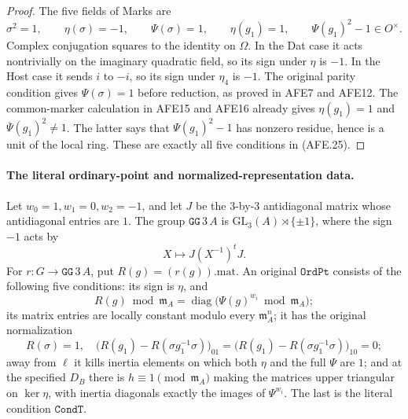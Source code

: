 \begin{proof}
The five fields of Marks are
\[
 \sigma^2=1,\qquad \eta(\sigma)=-1,\qquad
 \Psi(\sigma)=1,\qquad \eta(g_1)=1,\qquad
                         \Psi(g_1)^2-1\in O^\times.
                                                        \tag{AFE.25}
\]
Complex conjugation squares to the identity on
\(\Omega\).
In the Dat case it acts nontrivially on the imaginary
quadratic field, so its sign under \(\eta\) is \(-1\).
In the Host case it sends \(i\) to \(-i\), so its
sign under \(\eta_4\) is \(-1\).
The original parity condition gives
\(\Psi(\sigma)=1\) before reduction, as proved in
AFE7 and AFE12.
The common-marker calculation in AFE15 and AFE16
already gives
\(\eta(g_1)=1\) and \(\overline\Psi(g_1)^2\ne1\).
The latter says that \(\Psi(g_1)^2-1\) has nonzero
residue, hence is a unit of the local ring.
These are exactly all five conditions in (AFE.25).
\end{proof}

\paragraph{The literal ordinary-point and normalized-representation data.}
Let \(w_0=1,w_1=0,w_2=-1\), and let
\(J\) be the \(3\)-by-\(3\) antidiagonal matrix
whose antidiagonal entries are \(1\).
The group \(\texttt{GG}\,3\,A\) is
\(\mathrm{GL}_3(A)\rtimes\{\pm1\}\), where the sign
\(-1\) acts by
\[
                         X\longmapsto J(X^{-1})^tJ.
 \]
For \(r:G\to\texttt{GG}\,3\,A\), put \(R(g)=(r(g)).\mathrm{mat}\).
An original \(\texttt{OrdPt}\) consists of the following
five conditions: its sign is \(\eta\), and
\[
 R(g)\bmod\mathfrak m_A
   =\operatorname{diag}\bigl(\Psi(g)^{w_i}\bmod\mathfrak m_A\bigr);
 \]
its matrix entries are locally constant modulo every
\(\mathfrak m_A^n\); it has the original normalization
\[
 R(\sigma)=1,\quad
 \bigl(R(g_1)-R(\sigma g_1^{-1}\sigma)\bigr)_{01}
 =\bigl(R(g_1)-R(\sigma g_1^{-1}\sigma)\bigr)_{10}=0;
                                                        \tag{AFE.26}
\]
away from \(\ell\) it kills inertia elements on which
both \(\eta\) and the full \(\Psi\) are \(1\);
and at the specified \(D_B\) there is \(h\equiv1
\pmod{\mathfrak m_A}\) making the matrices upper
triangular on \(\ker\eta\), with inertia diagonals
exactly the images of \(\Psi^{w_i}\).
The last is the literal condition \(\texttt{CondT}\).

